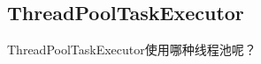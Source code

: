 \documentclass[../../../interview-questions.tex]{subfiles}
\begin{document}
\subsection{ThreadPoolTaskExecutor}

ThreadPoolTaskExecutor使用哪种线程池呢？
\end{document}
